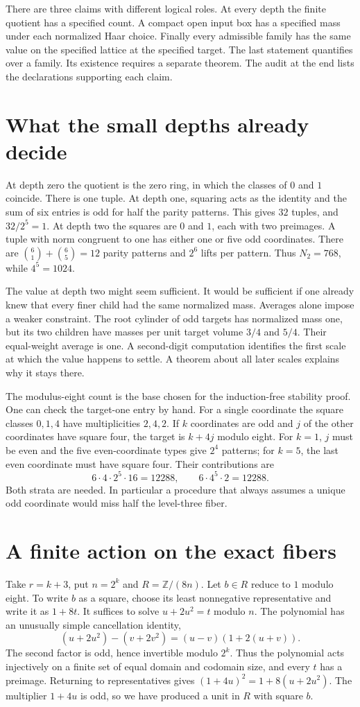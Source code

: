 \documentclass[12pt,letterpaper]{article}
\begin{document}
There are three claims with different logical roles. At every depth the finite quotient has a specified count. A compact open input box has a specified mass under each normalized Haar choice. Finally every admissible family has the same value on the specified lattice at the specified target. The last statement quantifies over a family. Its existence requires a separate theorem. The audit at the end lists the declarations supporting each claim.
\section{What the small depths already decide}
At depth zero the quotient is the zero ring, in which the classes of $0$ and $1$ coincide. There is one tuple. At depth one, squaring acts as the identity and the sum of six entries is odd for half the parity patterns. This gives $32$ tuples, and $32/2^5=1$. At depth two the squares are $0$ and $1$, each with two preimages. A tuple with norm congruent to one has either one or five odd coordinates. There are $\binom61+\binom65=12$ parity patterns and $2^6$ lifts per pattern. Thus $N_2=768$, while $4^5=1024$.

The value at depth two might seem sufficient. It would be sufficient if one already knew that every finer child had the same normalized mass. Averages alone impose a weaker constraint. The root cylinder of odd targets has normalized mass one, but its two children have masses per unit target volume $3/4$ and $5/4$. Their equal-weight average is one. A second-digit computation identifies the first scale at which the value happens to settle. A theorem about all later scales explains why it stays there.

The modulus-eight count is the base chosen for the induction-free stability proof. One can check the target-one entry by hand. For a single coordinate the square classes $0,1,4$ have multiplicities $2,4,2$. If $k$ coordinates are odd and $j$ of the other coordinates have square four, the target is $k+4j$ modulo eight. For $k=1$, $j$ must be even and the five even-coordinate types give $2^4$ patterns; for $k=5$, the last even coordinate must have square four. Their contributions are
\[
  6\cdot4\cdot 2^5\cdot16=12288,\qquad
  6\cdot4^5\cdot2=12288.
\]
Both strata are needed. In particular a procedure that always assumes a unique odd coordinate would miss half the level-three fiber.
\section{A finite action on the exact fibers}
Take $r=k+3$, put $n=2^k$ and $R=\mathbb Z/(8n)$. Let $b\in R$ reduce to $1$ modulo eight. To write $b$ as a square, choose its least nonnegative representative and write it as $1+8t$. It suffices to solve $u+2u^2=t$ modulo $n$. The polynomial has an unusually simple cancellation identity,
\[
 (u+2u^2)-(v+2v^2)=(u-v)(1+2(u+v)).
\]
The second factor is odd, hence invertible modulo $2^k$. Thus the polynomial acts injectively on a finite set of equal domain and codomain size, and every $t$ has a preimage. Returning to representatives gives $(1+4u)^2=1+8(u+2u^2)$. The multiplier $1+4u$ is odd, so we have produced a unit in $R$ with square $b$.
\end{document}
